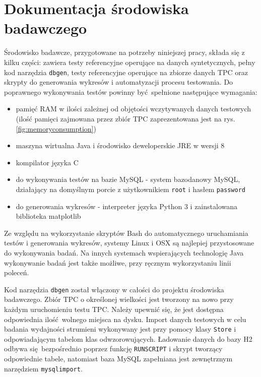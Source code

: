 \documentclass[12pt,twoside,openright]{extarticle}
\begin{document}
\cleardoublepage
\appendix
\section{Dokumentacja środowiska badawczego}

    Środowisko badawcze, przygotowane na potrzeby niniejszej pracy, składa się z kilku części: zawiera testy referencyjne operujące na danych syntetycznych, pełny kod narzędzia \texttt{dbgen}, testy referencyjne operujące na zbiorze danych TPC oraz skrypty do generowania wykresów i automatyzacji procesu testowania. Do poprawnego wykonywania testów powinny być spełnione następujące wymagania:
    
\begin{itemize}
    \item pamięć RAM w ilości zależnej od objętości wczytywanych danych testowych (ilość pamięci zajmowana przez zbiór TPC zaprezentowana jest na rys. \ref{fig:memoryconsumption})
    \item maszyna wirtualna Java i środowisko deweloperskie JRE w wersji 8
    \item kompilator języka C
    \item do wykonywania testów na bazie MySQL - system bazodanowy MySQL, działający na domyślnym porcie z użytkownikiem \texttt{root} i hasłem \texttt{password}
    \item do generowania wykresów - interpreter języka Python 3 i zainstalowana biblioteka matplotlib
\end{itemize}

    Ze względu na wykorzystanie skryptów Bash do automatycznego uruchamiania testów i generowania wykresów, systemy Linux i OSX są najlepiej przystosowane do wykonywania badań. Na innych systemach wspierających technologię Java wykonywanie badań jest także możliwe, przy ręcznym wykorzystaniu linii poleceń.

    Kod narzędzia \texttt{dbgen} został włączony w całości do projektu środowiska badawczego. Zbiór TPC o określonej wielkości jest tworzony na nowo przy każdym uruchomieniu testu TPC. Należy upewnić się, że jest dostępna odpowiednia ilość wolnego miejsca na dysku. Import danych testowych w celu badania wydajności strumieni wykonywany jest przy pomocy klasy \texttt{Store} i odpowiadającym tabelom klas odwzorowujących. Ładowanie danych do bazy H2 odbywa się bezpośrednio poprzez funkcję \texttt{RUNSCRIPT} i skrypt tworzący odpowiednie tabele, natomiast baza MySQL zapełniana jest zewnętrznym narzędziem \texttt{mysqlimport}.
\end{document}
